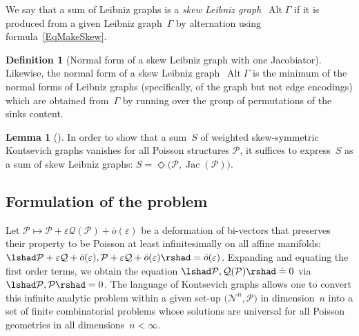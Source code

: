 \documentclass[a4paper]{jpconf}%
\theoremstyle{definition}
\newtheorem{lemma}[theor]{Lemma}%
\newtheorem{define}{Definition}%
\theoremstyle{remark}
\newcommand{\cP}{\mathcal{P}}\newcommand{\cR}{\mathcal{R}}
\newcommand{\cQ}{\mathcal{Q}}
\newcommand{\veps}{\varepsilon}
\DeclareMathOperator{\Alt}{Alt}
\DeclareMathOperator{\Jac}{Jac}
\begin{document}
We say that a sum of Leibniz graphs is a \emph{skew Leibniz graph}~$\Alt\Gamma$ 
if it is produced from a given Leibniz graph~$\Gamma$
by alternation using formula~\eqref{EqMakeSkew}.

\begin{define}[Normal form of a skew Leibniz graph with one Jacobiator]\label{DefSkewNormalForm}
Likewise, the normal form of a skew Leibniz graph~$\Alt\Gamma$ is the minimum of the normal forms of Leibniz graphs (specifically, of the graph but not edge encodings) which are obtained from~$\Gamma$ by running over the  group of permutations of the sinks content.
\end{define}

\begin{lemma}[\cite{sqs15}]
In order to show that a sum~$S$ of weighted skew\/-\/sym\-met\-ric 
Kontsevich graphs vanishes for all Poisson structures $\cP$, 
it suffices %
to express~$S$ as a sum of skew Leibniz graphs: 
$%
S = \Diamond\bigl(\cP,\Jac(\cP)\bigr)$.
\end{lemma}

\subsection{Formulation of the problem}%
Let $\cP \mapsto \cP + \varepsilon \cQ (\cP) + \bar{o}(\varepsilon)$ be a deformation of bi-vectors that preserves their property to be Poisson at least infinitesimally on all affine manifolds:
$%
\lshad\cP + \varepsilon\cQ + \bar{o}(\varepsilon), \cP + \varepsilon\cQ + \bar{o}(\varepsilon)\rshad = \bar{o}(\veps)$.
Expanding and equating the first order terms, we obtain the equation
$%
\lshad\cP,\cQ (\cP)\rshad \doteq 0$
 {via} %
$ \lshad\cP ,\cP\rshad = 0$.
The language of Kontsevich graphs %
allows one to convert this infinite analytic problem within a given set\/-\/up $\bigl(\mathcal{N}^n,\mathcal{P}\bigr)$ in dimension~$n$ into a set of finite combinatorial problems whose solutions are universal for all Poisson geometries in all dimensions~$n<\infty$.
\end{document}

